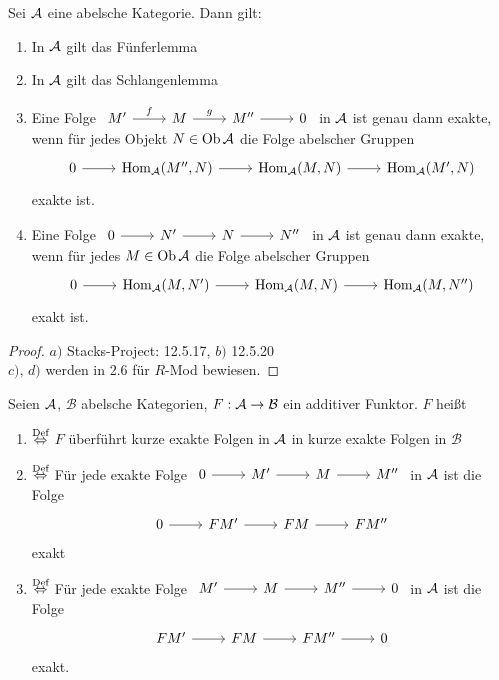 \begin{sa}\label{5.26}
	Sei $\mathcal{A}$ eine abelsche Kategorie. Dann gilt:
	\begin{enumerate}[label= \alph*)]
		\item In $\mathcal{A}$ gilt das Fünferlemma
		\item In $\mathcal{A}$ gilt das Schlangenlemma
		\item Eine Folge $\begin{tikzcd}
		M' \arrow{r}{f} & M \arrow{r}{g} & M'' \arrow{r} & 0
		\end{tikzcd}$ in $\mathcal{A}$ ist genau dann exakte, wenn für jedes Objekt $N\in \text{Ob}\,\mathcal{A}$ die Folge abelscher Gruppen 
		$$\begin{tikzcd}
		0 \arrow{r}& \Hom_\A(M'', N) \arrow{r} & \Hom_\A(M,N) \arrow{r} & \Hom_\A(M', N)
		\end{tikzcd}$$
		exakte ist.
		\item Eine Folge $\begin{tikzcd}
		0 \arrow{r}&  N' \arrow{r} & N \arrow{r}& N''
		\end{tikzcd}$ in $\mathcal{A}$ ist genau dann exakte, wenn für jedes $M\in \text{Ob}\,\mathcal{A}$ die Folge abelscher Gruppen
		$$\begin{tikzcd}
		0 \arrow{r}& \Hom_\A(M, N') \arrow{r} & \Hom_\A(M,N) \arrow{r} & \Hom_\A(M, N'')
		\end{tikzcd}$$
		exakt ist.
	\end{enumerate}
\end{sa}
\begin{proof}
	$a)$ Stacks-Project: 12.5.17, $b)$ 12.5.20\\
	$c), \, d)$ werden in 2.6 für $R$-Mod bewiesen.
\end{proof}
\begin{df}\label{5.27}
	Seien $\mathcal{A}$, $\mathcal{B}$ abelsche Kategorien, $F: \mathcal{A} \to \mathcal{B}$ ein additiver Funktor. $F$ heißt 
	\begin{enumerate}
		\item[]  $\overset{\text{Def}}{\Leftrightarrow}$ $F$ überführt kurze exakte Folgen in $\mathcal{A}$ in kurze exakte Folgen in $\mathcal{B}$
		\item[]  $\overset{\text{Def}}{\Leftrightarrow}$ Für jede exakte Folge $\begin{tikzcd}
		0 \arrow{r} & M' \arrow{r} & M \arrow{r} & M''
		\end{tikzcd}$ in $\mathcal{A}$ ist die Folge $$\begin{tikzcd}
		0 \arrow{r} & FM' \arrow{r} & FM \arrow{r} & FM''
		\end{tikzcd}$$ exakt
		\item[]  $\overset{\text{Def}}{\Leftrightarrow}$ Für jede exakte Folge $\begin{tikzcd}
		M' \arrow{r} & M \arrow{r} & M'' \arrow{r} & 0
		\end{tikzcd}$ in $\mathcal{A}$ ist die Folge
		$$\begin{tikzcd}
		FM' \arrow{r} & FM \arrow{r} & FM''  \arrow{r} & 0
		\end{tikzcd}$$
		exakt.
	\end{enumerate}
\end{df}
